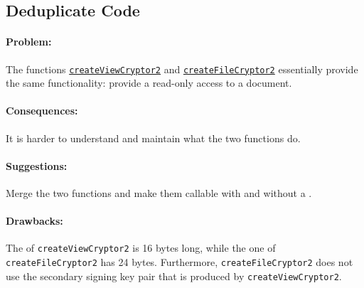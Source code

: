 \subsection{Deduplicate Code}

\paragraph{Problem:}
The functions \href{https://github.com/xwiki-labs/chainpad-crypto/blob/c8b76b895f67719a3b799daac3d832fdfea45613/crypto.js#L191}{\texttt{createViewCryptor2}} and \href{https://github.com/xwiki-labs/chainpad-crypto/blob/c8b76b895f67719a3b799daac3d832fdfea45613/crypto.js#L276}{\texttt{createFileCryptor2}} essentially provide the same functionality:
provide a read-only access to a document.

\paragraph{Consequences:}
It is harder to understand and maintain what the two functions do.

\paragraph{Suggestions:}
Merge the two functions and make them callable with and without a .

\paragraph{Drawbacks:}
The \mychanID of \texttt{createViewCryptor2} is 16 bytes long, while the one of \texttt{createFileCryptor2} has 24 bytes.
Furthermore, \texttt{createFileCryptor2} does not use the secondary signing key pair that is produced by \texttt{createViewCryptor2}.
